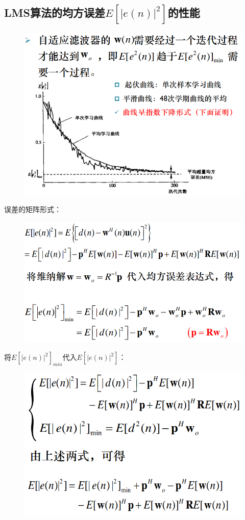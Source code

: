 \documentclass[UTF8]{ctexart} %
\begin{document}
		\subsection{LMS算法的均方误差$E[|e(n)|^2]$的性能}
			\begin{figure}[H]
				\centering\includegraphics[scale=0.4]{39.png}
			\end{figure}
			误差的矩阵形式：
			\begin{figure}[H]
				\centering\includegraphics[scale=0.4]{40.png}
			\end{figure}
			将$E[|e(n)|^2]_{min}$代入$E[|e(n)|^2]$：
			\begin{figure}[H]
				\centering\includegraphics[scale=0.45]{41.png}
			\end{figure}
\end{document}
